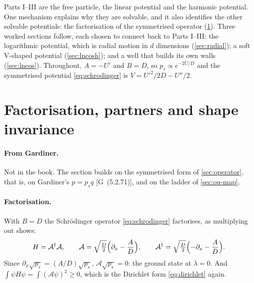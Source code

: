\documentclass[11pt]{article}
\numberwithin{equation}{section}
\newcommand{\G}[1]{[G~(#1)]}
\begin{document}
Parts I--III are the free particle, the linear potential and the harmonic potential. One mechanism explains why
they are solvable, and it also identifies the other solvable potentials: the factorisation of the symmetrised
operator (\cref{sec:solvable}). Three worked sections follow, each chosen to connect back to Parts I--III: the
logarithmic potential, which is radial motion in $d$ dimensions (\cref{sec:radial}); a soft V-shaped potential
(\cref{sec:lncosh}); and a well that builds its own walls (\cref{sec:lncos}). Throughout, $A=-U'$ and $B=D$, so
$p_s\propto e^{-2U/D}$ and the symmetrised potential \cref{eq:schrodinger} is $V=U'^2/2D-U''/2$.

\section{Factorisation, partners and shape invariance}
\label{sec:solvable}

\paragraph{From Gardiner.} Not in the book. The section builds on the symmetrised form of
\cref{sec:operator}, that is, on Gardiner's $p=p_sq$ \G{5.2.71}, and on the ladder of \cref{sec:ou-map}.

\paragraph{Factorisation.} With $B=D$ the Schr\"odinger operator \cref{eq:schrodinger} factorises, as
multiplying out shows:
\begin{equation}
  H=\mathcal A^\dagger\mathcal A,\qquad \mathcal A=\sqrt{\tfrac D2}\Bigl(\partial_x-\frac AD\Bigr),\qquad
  \mathcal A^\dagger=\sqrt{\tfrac D2}\Bigl(-\partial_x-\frac AD\Bigr).
  \label{eq:factor}
\end{equation}
Since $\partial_x\sqrt{p_s}=(A/D)\sqrt{p_s}$, $\mathcal A\sqrt{p_s}=0$: the ground state at $\lambda=0$. And
$\int\psi H\psi=\int(\mathcal A\psi)^2\ge0$, which is the Dirichlet form \cref{eq:dirichlet} again.
\end{document}
